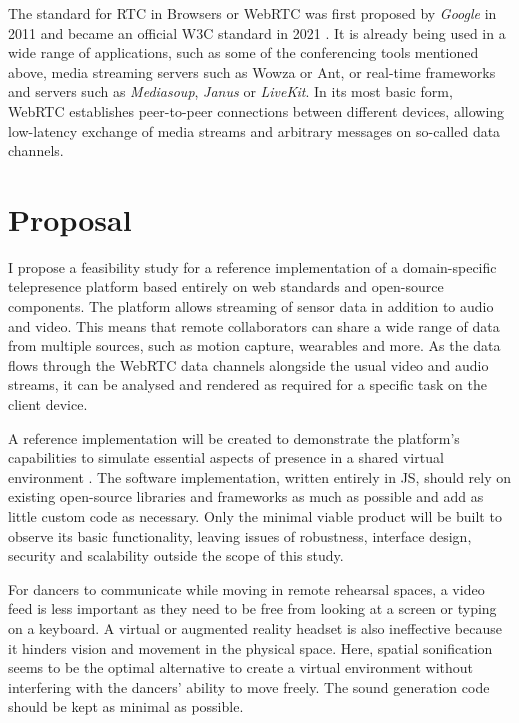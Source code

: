 The standard for \ac{RTC} in Browsers or \ac{WebRTC} \parencite{webRtcSpec} was first proposed by \emph{Google} in 2011 and became an official \ac{W3C} standard in 2021 \parencite{webRtcOfficialWebStandard}. It is already being used in a wide range of applications, such as some of the conferencing tools mentioned above, media streaming servers such as Wowza or Ant, or real-time frameworks and servers such as \emph{Mediasoup}, \emph{Janus} or \emph{LiveKit}. In its most basic form, \ac{WebRTC} establishes peer-to-peer connections between different devices, allowing low-latency exchange of media streams and arbitrary messages on so-called data channels.

\section{Proposal}

I propose a feasibility study for a reference implementation of a domain-specific telepresence platform based entirely on web standards and open-source components. The platform allows streaming of sensor data in addition to audio and video. This means that remote collaborators can share a wide range of data from multiple sources, such as motion capture, wearables and more. As the data flows through the WebRTC data channels alongside the usual video and audio streams, it can be analysed and rendered as required for a specific task on the client device.

A reference implementation will be created to demonstrate the platform's capabilities to simulate essential aspects of presence in a shared virtual environment \parencite{surveyOfPresence}. The software implementation, written entirely in \ac{JS}, should rely on existing open-source libraries and frameworks as much as possible and add as little custom code as necessary. Only the minimal viable product will be built to observe its basic functionality, leaving issues of robustness, interface design, security and scalability outside the scope of this study.

For dancers to communicate while moving in remote rehearsal spaces, a video feed is less important as they need to be free from looking at a screen or typing on a keyboard. A virtual or augmented reality headset is also ineffective because it hinders vision and movement in the physical space. Here, spatial sonification seems to be the optimal alternative to create a virtual environment without interfering with the dancers' ability to move freely. The sound generation code should be kept as minimal as possible.

